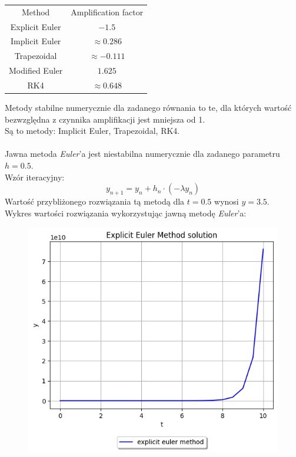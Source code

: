 \documentclass{article}
\begin{document}
\begin{center}
  \begin{tabular}{c c} 
   Method & Amplification factor\\
   Explicit Euler & $-1.5$\\
   Implicit Euler & $\approx 0.286$\\
   Trapezoidal  & $\approx -0.111$\\
   Modified Euler & $1.625$\\
   RK4 & $\approx 0.648$
  \end{tabular}
\end{center}

Metody stabilne numerycznie dla zadanego równania to te, dla których
wartość bezwzględna z czynnika amplifikacji jest mniejsza od 1.\\
Są to metody: Implicit Euler, Trapezoidal, RK4.\\\\

Jawna metoda \textit{Euler}'a jest niestabilna numerycznie dla zadanego
parametru $h=0.5$.\\
Wzór iteracyjny:
$$y_{n+1} = y_n + h_n\cdot (-\lambda y_n)$$
Wartość przybliżonego rozwiązania tą metodą dla $t=0.5$ wynosi
$y=3.5$.\\

Wykres wartości rozwiązania wykorzystując jawną metodę \textit{Euler}'a:
\begin{figure}[H]
  \includegraphics[width=\linewidth]{figures/explicit.png}
\end{figure}
\end{document}
